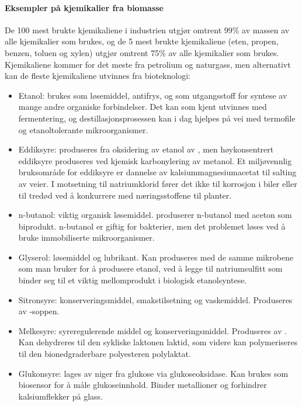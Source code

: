 \paragraph{Eksempler på kjemikalier fra biomasse} De 100 mest brukte kjemikaliene i industrien utgjør omtrent 99\% av massen av alle kjemikalier som brukes, og de 5 mest brukte kjemikaliene (eten, propen, benzen, toluen og xylen) utgjør omtrent 75\% av alle kjemikalier som brukes. Kjemikaliene kommer for det meste fra petrolium og naturgass, men alternativt kan de fleste kjemikaliene utvinnes fra bioteknologi:
\begin{itemize}[noitemsep,nolistsep]
	\item Etanol: brukes som løsemiddel, antifrys, og som utgangsstoff for syntese av mange andre organiske forbindelser. Det kan som kjent utvinnes med fermentering, og destillasjonsprosessen kan i dag hjelpes på vei med termofile og etanoltolerante mikroorganismer.
	\item Eddiksyre: produseres fra oksidering av etanol av , men høykonsentrert eddiksyre produseres ved kjemisk karbonylering av metanol. Et miljøvennlig bruksområde for eddiksyre er dannelse av kalsiummagnesiumacetat til salting av veier. I motsetning til natriumklorid fører det ikke til korrosjon i biler eller til tredød ved å konkurrere med næringsstoffene til planter.
	\item n-butanol: viktig organisk løsemiddel.  produserer n-butanol med aceton som biprodukt. n-butanol er giftig for bakterier, men det problemet løses ved å bruke immobiliserte mikroorganismer.
	\item Glyserol: løsemiddel og lubrikant. Kan produseres med de samme mikrobene som man bruker for å produsere etanol, ved å legge til natriumsulfitt som binder seg til et viktig mellomprodukt i biologisk etanolsyntese.
	\item Sitronsyre: konserveringsmiddel, smakstilsetning og vaskemiddel. Produseres av -soppen. 
	\item Melkesyre: syreregulerende middel og konserveringsmiddel. Produseres av . Kan dehydreres til den sykliske laktonen laktid, som videre kan polymeriseres til den bionedgraderbare polyesteren polylaktat.
	\item Glukonsyre: lages av  niger fra glukose via glukoseoksidase. Kan brukes som biosensor for å måle glukoseinnhold. Binder metallioner og forhindrer kalsiumflekker på glass.
\end{itemize}

